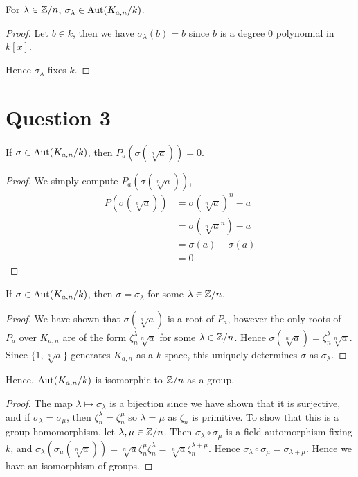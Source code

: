 \documentclass{unswmaths}
\begin{document}
\begin{corollary}
    For $\lambda \in \mathbb{Z}/n$, $\sigma_\lambda \in \operatorname{Aut}(K_{a,n}/k)$.
\end{corollary}
\begin{proof}
    Let $b \in k$, then we
    have $\sigma_\lambda(b) = b$ since $b$ is a degree $0$
    polynomial in $k[x]$.
    
    Hence $\sigma_\lambda$ fixes $k$.
\end{proof} 
\section*{Question 3}
\begin{lemma}
If $\sigma \in \operatorname{Aut}(K_{a,n}/k)$, then $P_a(\sigma(\sqrt[n]{a})) = 0$.
\end{lemma}
\begin{proof}
We simply compute $P_a(\sigma(\sqrt[n]{a}))$,
\begin{align*}
P(\sigma(\sqrt[n]{a})) &= \sigma(\sqrt[n]{a})^n-a\\
&= \sigma(\sqrt[n]{a}^n)-a\\
&= \sigma(a)-\sigma(a)\\
&= 0.
\end{align*}
\end{proof}
\begin{lemma}
If $\sigma \in \operatorname{Aut}(K_{a,n}/k)$, then $\sigma = \sigma_\lambda$ for some $\lambda \in \mathbb{Z}/n$.
\end{lemma}
\begin{proof}
We have shown that $\sigma(\sqrt[n]{a})$ is a root of $P_a$, however the only roots of $P_{a}$ over
$K_{a,n}$ are of the form $\zeta_{n}^\lambda \sqrt[n]{a}$ for some $\lambda \in \mathbb{Z}/n$.
Hence $\sigma(\sqrt[n]{a}) = \zeta_n^\lambda \sqrt[n]{a}$. Since $\{1,\sqrt[n]{a}\}$
generates $K_{a,n}$ as a $k$-space, this uniquely determines $\sigma$ as $\sigma_\lambda$.
\end{proof}
\begin{theorem}
Hence, $\operatorname{Aut}(K_{a,n}/k)$ is isomorphic to $\mathbb{Z}/n$ as a group.
\end{theorem}
\begin{proof}
The map $\lambda \mapsto \sigma_\lambda$ is a bijection since we
have shown that it is surjective, and if $\sigma_\lambda = \sigma_\mu$, then
$\zeta_n^\lambda = \zeta_n^\mu$ so $\lambda = \mu$ as $\zeta_n$ is primitive.
To show that this is a group homomorphism, let $\lambda,\mu \in \mathbb{Z}/n$.
Then $\sigma_\lambda\circ\sigma_\mu$ is a field automorphism fixing $k$,
and $\sigma_\lambda(\sigma_\mu(\sqrt[n]{a})) = \sqrt[n]{a}\zeta_n^\mu\zeta_n^\lambda = \sqrt[n]{a}\zeta_n^{\lambda+\mu}$.
Hence $\sigma_\lambda\circ \sigma_\mu = \sigma_{\lambda+\mu}$.
Hence we have an isomorphism of groups.
\end{proof}
\end{document}
